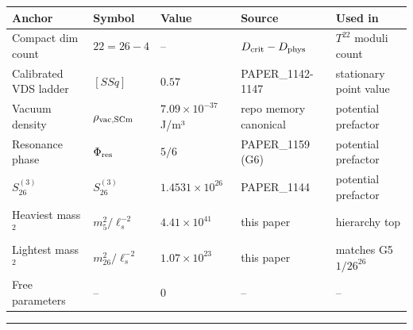 \documentclass[
]{article}
\newcounter{none} %
\begin{document}
{\def\LTcaptype{none} %
\begin{longtable}[]{@{}
  >{\raggedright\arraybackslash}p{}
  >{\raggedright\arraybackslash}p{}
  >{\raggedleft\arraybackslash}p{}
  >{\raggedright\arraybackslash}p{}
  >{\raggedright\arraybackslash}p{}@{}}
\toprule\noalign{}
\begin{minipage}[b]{\linewidth}\raggedright
Anchor
\end{minipage} & \begin{minipage}[b]{\linewidth}\raggedright
Symbol
\end{minipage} & \begin{minipage}[b]{\linewidth}\raggedleft
Value
\end{minipage} & \begin{minipage}[b]{\linewidth}\raggedright
Source
\end{minipage} & \begin{minipage}[b]{\linewidth}\raggedright
Used in
\end{minipage} \\
\midrule\noalign{}
\endhead
\bottomrule\noalign{}
\endlastfoot
Compact dim count & \(22 = 26 - 4\) & -- &
\(D_{\rm crit} - D_{\rm phys}\) & \(T^{22}\) moduli count \\
Calibrated VDS ladder & \([SSq]\) & \(0.57\) & PAPER\_1142-1147 &
stationary point value \\
Vacuum density & \(\rho_{\rm vac,SCm}\) & \(7.09\times 10^{-37}\) J/m³ &
repo memory canonical & potential prefactor \\
Resonance phase & \(\Phi_{\rm res}\) & \(5/6\) & PAPER\_1159 (G6) &
potential prefactor \\
\(S_{26}^{(3)}\) & \(S_{26}^{(3)}\) & \(1.4531\times 10^{26}\) &
PAPER\_1144 & potential prefactor \\
Heaviest mass\(^2\) & \(m_5^2/\ell_s^{-2}\) & \(4.41\times 10^{41}\) &
this paper & hierarchy top \\
Lightest mass\(^2\) & \(m_{26}^2/\ell_s^{-2}\) & \(1.07\times 10^{23}\)
& this paper & matches G5 \(1/26^{26}\) \\
Free parameters & -- & \(0\) & -- & -- \\
\end{longtable}
}

\begin{center}\rule{0.5\linewidth}{0.5pt}\end{center}
\end{document}
